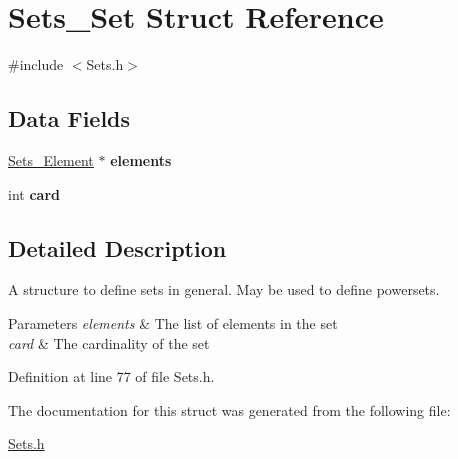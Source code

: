 \hypertarget{struct_sets___set}{
\section{Sets\_\-Set Struct Reference}
\label{struct_sets___set}
}


{\ttfamily \#include $<$Sets.h$>$}

\subsection*{Data Fields}
\begin{DoxyCompactItemize}
\item 
\hypertarget{struct_sets___set_a2f23de91b701f2f4835a0827a4bb39cb}{
\hyperlink{struct_sets___element}{Sets\_\-Element} $\ast$ {\bfseries elements}}
\label{struct_sets___set_a2f23de91b701f2f4835a0827a4bb39cb}

\item 
\hypertarget{struct_sets___set_acd789e381a684163a021e2d228653afd}{
int {\bfseries card}}
\label{struct_sets___set_acd789e381a684163a021e2d228653afd}

\end{DoxyCompactItemize}


\subsection{Detailed Description}
A structure to define sets in general. May be used to define powersets. 
\begin{DoxyParams}{Parameters}
{\em elements} & The list of elements in the set \\
\hline
{\em card} & The cardinality of the set \\
\hline
\end{DoxyParams}


Definition at line 77 of file Sets.h.



The documentation for this struct was generated from the following file:\begin{DoxyCompactItemize}
\item 
\hyperlink{_sets_8h}{Sets.h}\end{DoxyCompactItemize}
